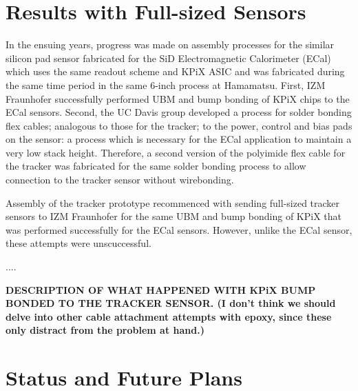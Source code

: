 \documentclass[prc,12pt,nofootinbib,letterpaper]{revtex4}
\begin{document}
\section{Results with Full-sized Sensors}

In the ensuing years, progress was made on assembly processes for the similar silicon pad sensor fabricated for the SiD Electromagnetic Calorimeter (ECal) which uses the same readout scheme and KPiX ASIC and was fabricated during the same time period in the same 6-inch process at Hamamatsu.  First, IZM Fraunhofer successfully performed UBM and bump bonding of KPiX chips to the ECal sensors.  Second, the UC Davis group developed a process for solder bonding flex cables; analogous to those for the tracker; to the power, control and bias pads on the sensor: a process which is necessary for the ECal application to maintain a very low stack height.  Therefore, a second version of the polyimide flex cable for the tracker was fabricated for the same solder bonding process to allow connection to the tracker sensor without wirebonding.  

Assembly of the tracker prototype recommenced with sending full-sized tracker sensors to IZM Fraunhofer for the same UBM and bump bonding of KPiX that was performed successfully for the ECal sensors.  However, unlike the ECal sensor, these attempts were unscuccessful.

....

\textbf{DESCRIPTION OF WHAT HAPPENED WITH KPiX BUMP BONDED TO THE TRACKER SENSOR.  (I don't think we should delve into other cable attachment attempts with epoxy, since these only distract from the problem at hand.)}

\section{Status and Future Plans}
\end{document}
